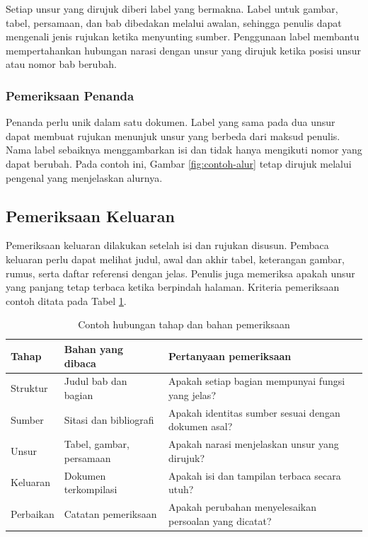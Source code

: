 Setiap unsur yang dirujuk diberi label yang bermakna. Label untuk gambar, tabel, persamaan, dan bab dibedakan melalui awalan, sehingga penulis dapat mengenali jenis rujukan ketika menyunting sumber. Penggunaan label membantu mempertahankan hubungan narasi dengan unsur yang dirujuk ketika posisi unsur atau nomor bab berubah.

\subsubsection{Pemeriksaan Penanda}

Penanda perlu unik dalam satu dokumen. Label yang sama pada dua unsur dapat membuat rujukan menunjuk unsur yang berbeda dari maksud penulis. Nama label sebaiknya menggambarkan isi dan tidak hanya mengikuti nomor yang dapat berubah. Pada contoh ini, Gambar \ref{fig:contoh-alur} tetap dirujuk melalui pengenal yang menjelaskan alurnya.

\subsection{Pemeriksaan Keluaran}

Pemeriksaan keluaran dilakukan setelah isi dan rujukan disusun. Pembaca keluaran perlu dapat melihat judul, awal dan akhir tabel, keterangan gambar, rumus, serta daftar referensi dengan jelas. Penulis juga memeriksa apakah unsur yang panjang tetap terbaca ketika berpindah halaman. Kriteria pemeriksaan contoh ditata pada Tabel \ref{tab:contoh-metode}.

\begin{table}[htbp]
  \centering
  \caption{Contoh hubungan tahap dan bahan pemeriksaan}
  \label{tab:contoh-metode}
  \begin{tabular}{p{3.2cm}p{4.0cm}p{5.0cm}}
    \toprule
    Tahap & Bahan yang dibaca & Pertanyaan pemeriksaan \\
    \midrule
    Struktur & Judul bab dan bagian & Apakah setiap bagian mempunyai fungsi yang jelas? \\
    Sumber & Sitasi dan bibliografi & Apakah identitas sumber sesuai dengan dokumen asal? \\
    Unsur & Tabel, gambar, persamaan & Apakah narasi menjelaskan unsur yang dirujuk? \\
    Keluaran & Dokumen terkompilasi & Apakah isi dan tampilan terbaca secara utuh? \\
    Perbaikan & Catatan pemeriksaan & Apakah perubahan menyelesaikan persoalan yang dicatat? \\
    \bottomrule
  \end{tabular}
\end{table}

